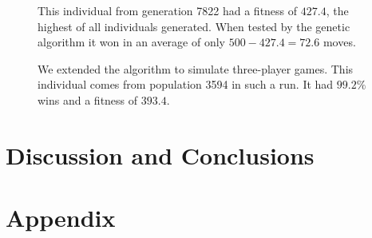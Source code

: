 \documentclass[a4paper,11pt]{article}
\begin{document}
\begin{figure}
\centering

\caption{This individual from generation 7822 had a fitness of
  $427.4$, the highest of all individuals generated. When tested by
  the genetic algorithm it won in an average of only $500-427.4=72.6$
  moves.}
\label{genpop7822}
\end{figure}

\begin{figure}
\centering

\caption{We extended the algorithm to simulate three-player games.
  This individual comes from population 3594 in such a run. It had
  $99.2\%$ wins and a fitness of $393.4$.}
\label{gen3pop3594}
\end{figure}

\section{Discussion and Conclusions}





\section{Appendix}



\end{document}
